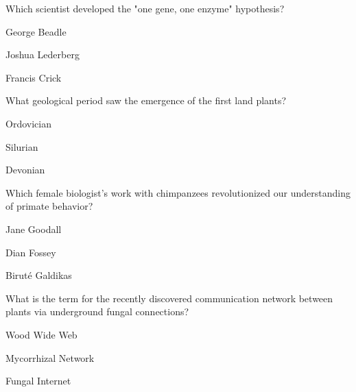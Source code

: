\begin{enhancedmcq}{Which scientist developed the "one gene, one enzyme" hypothesis?}
\item George Beadle
\item Joshua Lederberg
\item Francis Crick

\end{enhancedmcq}
\begin{enhancedmcq}{What geological period saw the emergence of the first land plants?}
\item Ordovician
\item Silurian
\item Devonian

\end{enhancedmcq}
\begin{enhancedmcq}{Which female biologist's work with chimpanzees revolutionized our understanding of primate behavior?}
\item Jane Goodall
\item Dian Fossey
\item Biruté Galdikas

\end{enhancedmcq}
\begin{enhancedmcq}{What is the term for the recently discovered communication network between plants via underground fungal connections?}
\item Wood Wide Web
\item Mycorrhizal Network
\item Fungal Internet
\end{enhancedmcq}